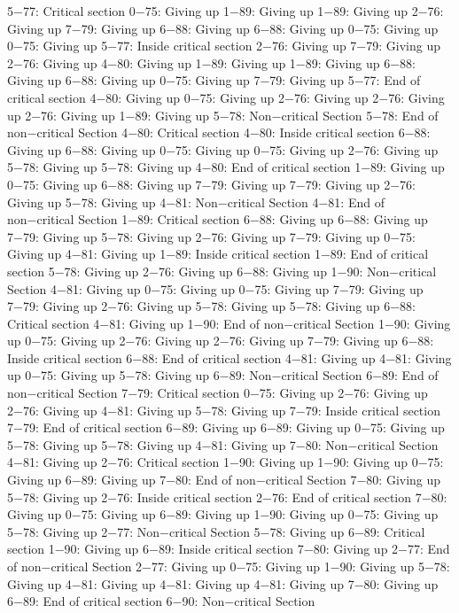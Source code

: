 5−77: Critical section
0−75: Giving up
1−89: Giving up
1−89: Giving up
2−76: Giving up
7−79: Giving up
6−88: Giving up
6−88: Giving up
0−75: Giving up
0−75: Giving up
5−77: Inside critical section
2−76: Giving up
7−79: Giving up
2−76: Giving up
4−80: Giving up
1−89: Giving up
1−89: Giving up
6−88: Giving up
6−88: Giving up
0−75: Giving up
7−79: Giving up
5−77: End of critical section
4−80: Giving up
0−75: Giving up
2−76: Giving up
2−76: Giving up
2−76: Giving up
1−89: Giving up
5−78: Non−critical Section
5−78: End of non−critical Section
4−80: Critical section
4−80: Inside critical section
6−88: Giving up
6−88: Giving up
0−75: Giving up
0−75: Giving up
2−76: Giving up
5−78: Giving up
5−78: Giving up
4−80: End of critical section
1−89: Giving up
0−75: Giving up
6−88: Giving up
7−79: Giving up
7−79: Giving up
2−76: Giving up
5−78: Giving up
4−81: Non−critical Section
4−81: End of non−critical Section
1−89: Critical section
6−88: Giving up
6−88: Giving up
7−79: Giving up
5−78: Giving up
2−76: Giving up
7−79: Giving up
0−75: Giving up
4−81: Giving up
1−89: Inside critical section
1−89: End of critical section
5−78: Giving up
2−76: Giving up
6−88: Giving up
1−90: Non−critical Section
4−81: Giving up
0−75: Giving up
0−75: Giving up
7−79: Giving up
7−79: Giving up
2−76: Giving up
5−78: Giving up
5−78: Giving up
6−88: Critical section
4−81: Giving up
1−90: End of non−critical Section
1−90: Giving up
0−75: Giving up
2−76: Giving up
2−76: Giving up
7−79: Giving up
6−88: Inside critical section
6−88: End of critical section
4−81: Giving up
4−81: Giving up
0−75: Giving up
5−78: Giving up
6−89: Non−critical Section
6−89: End of non−critical Section
7−79: Critical section
0−75: Giving up
2−76: Giving up
2−76: Giving up
4−81: Giving up
5−78: Giving up
7−79: Inside critical section
7−79: End of critical section
6−89: Giving up
6−89: Giving up
0−75: Giving up
5−78: Giving up
5−78: Giving up
4−81: Giving up
7−80: Non−critical Section
4−81: Giving up
2−76: Critical section
1−90: Giving up
1−90: Giving up
0−75: Giving up
6−89: Giving up
7−80: End of non−critical Section
7−80: Giving up
5−78: Giving up
2−76: Inside critical section
2−76: End of critical section
7−80: Giving up
0−75: Giving up
6−89: Giving up
1−90: Giving up
0−75: Giving up
5−78: Giving up
2−77: Non−critical Section
5−78: Giving up
6−89: Critical section
1−90: Giving up
6−89: Inside critical section
7−80: Giving up
2−77: End of non−critical Section
2−77: Giving up
0−75: Giving up
1−90: Giving up
5−78: Giving up
4−81: Giving up
4−81: Giving up
4−81: Giving up
7−80: Giving up
6−89: End of critical section
6−90: Non−critical Section
